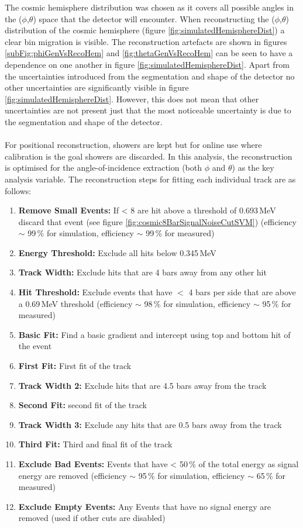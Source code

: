 The cosmic hemisphere distribution was chosen as it covers all possible angles in the ($\phi$,$\theta$) space that the detector will encounter. When reconstructing the ($\phi$,$\theta$) distribution of the cosmic hemisphere (figure \ref{fig:simulatedHemisphereDist}) a clear bin migration is visible. The reconstruction artefacts are shown in figures \ref{subFig:phiGenVsRecoHem} and \ref{fig:thetaGenVsRecoHem} can be seen to have a dependence on one another in figure \ref{fig:simulatedHemisphereDist}. Apart from the uncertainties introduced from the segmentation and shape of the detector no other uncertainties are significantly visible in figure \ref{fig:simulatedHemisphereDist}. However, this does not mean that other uncertainties are not present just that the most noticeable uncertainty is due to the segmentation and shape of the detector. 
\\\\For positional reconstruction, showers are kept but for online use where calibration is the goal showers are discarded. In this analysis, the reconstruction is optimised for the angle-of-incidence extraction (both $\phi$ and $\theta$) as the key analysis variable. The reconstruction steps for fitting each individual track are as follows: 
\begin{enumerate}
  \item \textbf{Remove Small Events:} If < 8 are hit above a threshold of 0.693\,MeV discard that event (see figure \ref{fig:cosmic8BarSignalNoiseCutSVM}) (efficiency $\sim$ 99\,\% for simulation, efficiency $\sim$ 99\,\% for measured)
  \item \textbf{Energy Threshold:} Exclude all hits below 0.345\,MeV
  \item \textbf{Track Width:} Exclude hits that are 4 bars away from any other hit 
  \item \textbf{Hit Threshold:} Exclude events that have $<$ 4 bars per side that are above a 0.69\,MeV threshold (efficiency $\sim$ 98\,\% for simulation, efficiency $\sim$ 95\,\% for measured)
  \item \textbf{Basic Fit:} Find a basic gradient and intercept using top and bottom hit of the event
  \item \textbf{First Fit:} First fit of the track 
  \item \textbf{Track Width 2:} Exclude hits that are 4.5 bars away from the track
  \item \textbf{Second Fit:} second fit of the track
  \item \textbf{Track Width 3:} Exclude any hits that are 0.5 bars away from the track
  \item \textbf{Third Fit:} Third and final fit of the track
  \item \textbf{Exclude Bad Events:} Events that have < 50\,\% of the total energy as signal energy are removed (efficiency $\sim$ 95\,\% for simulation, efficiency $\sim$ 65\,\% for measured)
  \item \textbf{Exclude Empty Events:} Any Events that have no signal energy are removed (used if other cuts are disabled) 
\end{enumerate}

